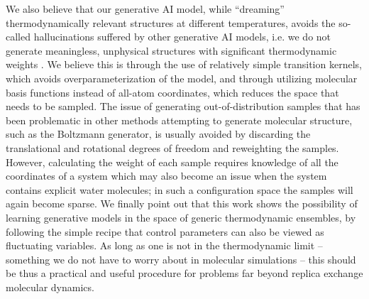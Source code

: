 \documentclass[9pt,twocolumn,twoside]{pnas-new}
\newcommand{\onlinecite}[1]{\hspace{-1 ex} \nocite{#1}\citenum{#1}}
\begin{document}
We also believe that our generative AI model, while ``dreaming'' thermodynamically relevant structures at different temperatures, avoids the so-called hallucinations suffered by other generative AI models, i.e. we do not generate meaningless, unphysical structures with significant thermodynamic weights \cite{deep_learning_book}. We believe this is through the use of relatively simple transition kernels, which avoids overparameterization of the model, and through utilizing molecular basis functions instead of all-atom coordinates, which reduces the space that needs to be sampled. The issue of generating out-of-distribution samples that has been problematic in other methods attempting to generate molecular structure, such as the Boltzmann generator, is usually avoided by discarding the translational and rotational degrees of freedom and reweighting the samples.\cite{Boltzmann_generators, stochastic_NF} However, calculating the weight of each sample requires knowledge of all the coordinates of a system which may also become an issue when the system contains explicit water molecules; in such a configuration space the samples will again become sparse.  We finally point out that this work shows the possibility of learning generative models in the space of generic thermodynamic ensembles, by following the simple recipe that control parameters can also be viewed as fluctuating variables. As long as one is not in the thermodynamic limit -- something we do not have to worry about in molecular simulations -- this should be thus a practical and useful procedure for problems far beyond replica exchange molecular dynamics.



\end{document}
